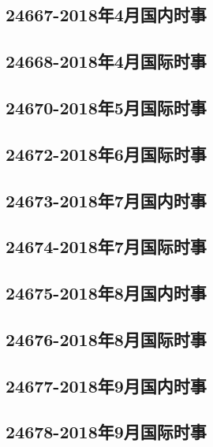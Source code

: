\subsection{24667-2018年4月国内时事}

\subsection{24668-2018年4月国际时事}

\subsection{24670-2018年5月国际时事}

\subsection{24672-2018年6月国际时事}

\subsection{24673-2018年7月国内时事}

\subsection{24674-2018年7月国际时事}

\subsection{24675-2018年8月国内时事}

\subsection{24676-2018年8月国际时事}

\subsection{24677-2018年9月国内时事}

\subsection{24678-2018年9月国际时事}

